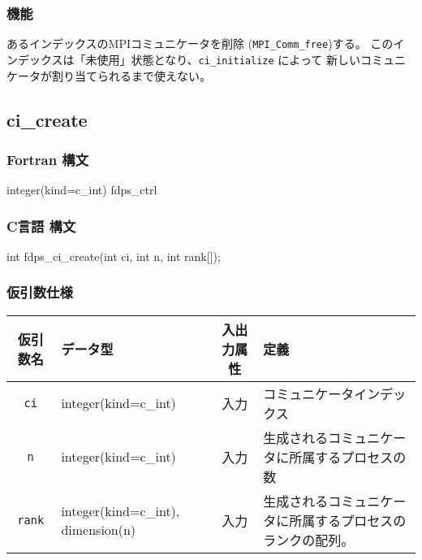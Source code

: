 \subsubsection*{機能}
あるインデックスのMPIコミュニケータを削除 ({\tt MPI\_Comm\_free})する。
このインデックスは「未使用」状態となり、{\tt ci\_initialize} によって
新しいコミュニケータが割り当てられるまで使えない。


\subsection{ci\_create}
\subsubsection*{Fortran 構文}
\begin{screen}
\begin{spverbatim}
integer(kind=c_int) fdps_ctrl%
\end{spverbatim}
\end{screen}

\subsubsection*{C言語 構文}
\begin{screen}
\begin{spverbatim}
int fdps_ci_create(int ci, int n, int rank[]);
\end{spverbatim}
\end{screen}

\subsubsection*{仮引数仕様}
\begin{table}[h]
\begin{tabularx}{\linewidth}{cXcX}
\toprule
\rowcolor{Snow2}
仮引数名 & データ型 & 入出力属性 & 定義 \\
\midrule
\verb|ci| & integer(kind=c\_int) & 入力 & コミュニケータインデックス\\
\verb|n| & integer(kind=c\_int) & 入力 &生成されるコミュニケータに所属するプロセスの数\\
\verb|rank| & integer(kind=c\_int), dimension(n) & 入力 &生成されるコミュニケータに所属するプロセスのランクの配列。\\
\bottomrule
\end{tabularx}
\end{table}


